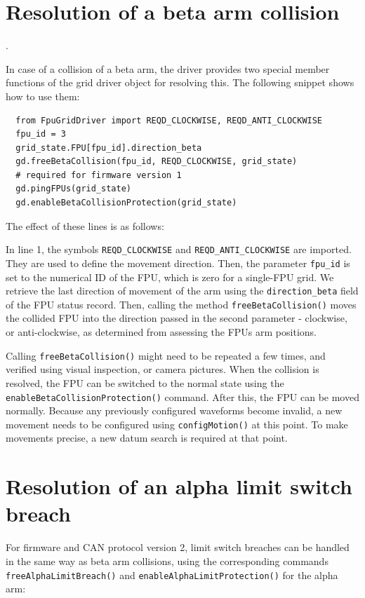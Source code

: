 \documentclass[fontsize=12,a4paper]{scrreprt}
\begin{document}
\section{Resolution of a beta arm collision}
\label{sec:betacollisionresolution}.

In case of a collision of a beta arm, the driver provides two special
member functions of the grid driver object for resolving this. The
following snippet shows how to use them:

\begin{verbatim}
  from FpuGridDriver import REQD_CLOCKWISE, REQD_ANTI_CLOCKWISE
  fpu_id = 3
  grid_state.FPU[fpu_id].direction_beta
  gd.freeBetaCollision(fpu_id, REQD_CLOCKWISE, grid_state)
  # required for firmware version 1
  gd.pingFPUs(grid_state)
  gd.enableBetaCollisionProtection(grid_state)
\end{verbatim}

The effect of these lines is as follows:

In line 1, the symbols \texttt{REQD\_CLOCKWISE} and
\texttt{REQD\_ANTI\_CLOCKWISE} are imported. They are used to define
the movement direction. Then, the parameter \texttt{fpu\_id} is set to
the numerical ID of the FPU, which is zero for a single-FPU grid. We
retrieve the last direction of movement of the arm using the
\texttt{direction\_beta} field of the FPU status record.  Then,
calling the method \texttt{freeBetaCollision()} moves the collided FPU
into the direction passed in the second parameter - clockwise, or
anti-clockwise, as determined from assessing the FPUs arm positions.

Calling \texttt{freeBetaCollision()} might need to be repeated a few
times, and verified using visual inspection, or camera pictures. When
the collision is resolved, the FPU can be switched to the normal state
using the \texttt{enableBetaCollisionProtection()} command.  After
this, the FPU can be moved normally. Because any previously configured
waveforms become invalid, a new movement needs to be configured using
\texttt{configMotion()} at this point. To make movements precise, a
new datum search is required at that point.

\section{Resolution of an alpha limit switch breach}
  
For firmware and CAN protocol version 2, limit switch breaches can be
handled in the same way as beta arm collisions, using the corresponding
commands \texttt{freeAlphaLimitBreach()} and \texttt{enableAlphaLimitProtection()} for the alpha arm:
\end{document}
